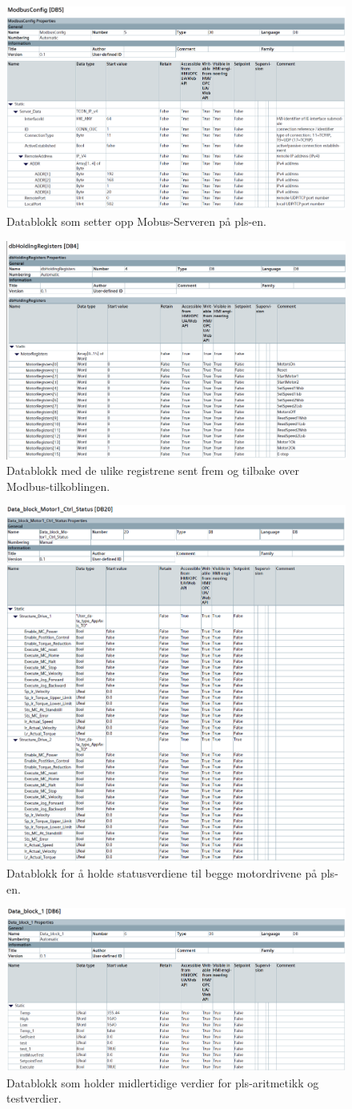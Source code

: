 \begin{figure}[H]
    \centering
    \includegraphics[width=0.5\linewidth]{DBs/ModbusConfig.PNG}
    \caption{Datablokk  som setter opp Mobus-Serveren på \acrshort{pls}-en.}
    \label{fig:ModbusConfig}
\end{figure}
\begin{figure}[H]
    \centering
    \includegraphics[width=0.5\linewidth]{DBs/dbHoldingRegisters.PNG}
    \caption{Datablokk med de ulike registrene sent frem og tilbake over Modbus-tilkoblingen.}
    \label{fig:dbHoldReg}
\end{figure}
\begin{figure}[H]
    \centering
    \includegraphics[width=0.5\linewidth]{DBs/MotorCtrlStatus.PNG}
    \caption{Datablokk for å holde statusverdiene til begge motordrivene på \acrshort{pls}-en.}
    \label{fig:MotorSTS}
\end{figure}
\begin{figure}[H]
    \centering
    \includegraphics[width=0.5\linewidth]{DBs/temp.PNG}
    \caption{Datablokk som holder midlertidige verdier for \acrshort{pls}-aritmetikk og testverdier.}
    \label{fig:temp}
\end{figure}